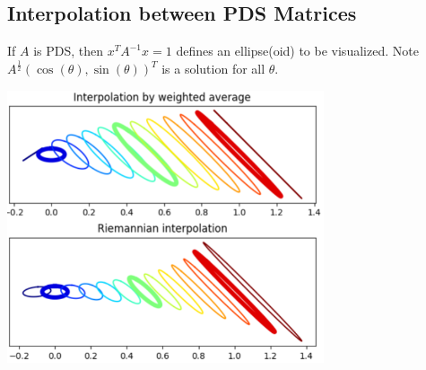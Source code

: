 \documentclass[10pt]{article}
\begin{document}
\subsection*{Interpolation between PDS Matrices}
If $A$ is PDS, then $x^T A^{-1} x = 1$ defines an ellipse(oid) to be visualized.  Note $A^{\frac{1}{2}} (\cos(\theta), \sin(\theta))^T$ is a solution for all $\theta$.
\begin{center} 
	\includegraphics*[width=0.7\textwidth]{W9_5.png} 
\end{center}
\end{document}
